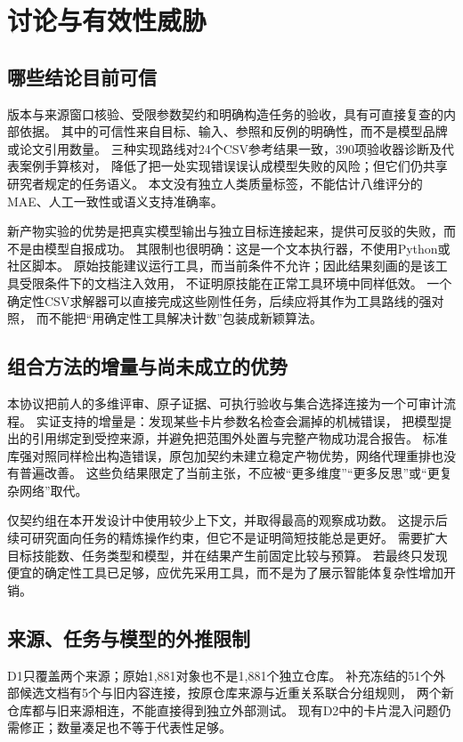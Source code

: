 \section{讨论与有效性威胁}
\subsection{哪些结论目前可信}
版本与来源窗口核验、受限参数契约和明确构造任务的验收，具有可直接复查的内部依据。
其中的可信性来自目标、输入、参照和反例的明确性，而不是模型品牌或论文引用数量。
三种实现路线对24个CSV参考结果一致，390项验收器诊断及代表案例手算核对，
降低了把一处实现错误误认成模型失败的风险；但它们仍共享研究者规定的任务语义。
本文没有独立人类质量标签，不能估计八维评分的MAE、人工一致性或语义支持准确率。

新产物实验的优势是把真实模型输出与独立目标连接起来，提供可反驳的失败，而不是由模型自报成功。
其限制也很明确：这是一个文本执行器，不使用Python或社区脚本。
原始技能建议运行工具，而当前条件不允许；因此结果刻画的是该工具受限条件下的文档注入效用，
不证明原技能在正常工具环境中同样低效。
一个确定性CSV求解器可以直接完成这些刚性任务，后续应将其作为工具路线的强对照，
而不能把“用确定性工具解决计数”包装成新颖算法。

\subsection{组合方法的增量与尚未成立的优势}
本协议把前人的多维评审、原子证据、可执行验收与集合选择连接为一个可审计流程。
实证支持的增量是：发现某些卡片参数名检查会漏掉的机械错误，
把模型提出的引用绑定到受控来源，并避免把范围外处置与完整产物成功混合报告。
标准库强对照同样检出构造错误，原包加契约未建立稳定产物优势，网络代理重排也没有普遍改善。
这些负结果限定了当前主张，不应被“更多维度”“更多反思”或“更复杂网络”取代。

仅契约组在本开发设计中使用较少上下文，并取得最高的观察成功数。
这提示后续可研究面向任务的精炼操作约束，但它不是证明简短技能总是更好。
需要扩大目标技能数、任务类型和模型，并在结果产生前固定比较与预算。
若最终只发现便宜的确定性工具已足够，应优先采用工具，而不是为了展示智能体复杂性增加开销。

\subsection{来源、任务与模型的外推限制}
D1只覆盖两个来源；原始1,881对象也不是1,881个独立仓库。
补充冻结的51个外部候选文档有5个与旧内容连接，按原仓库来源与近重关系联合分组规则，
两个新仓库都与旧来源相连，不能直接得到独立外部测试。
现有D2中的卡片混入问题仍需修正；数量凑足也不等于代表性足够。

